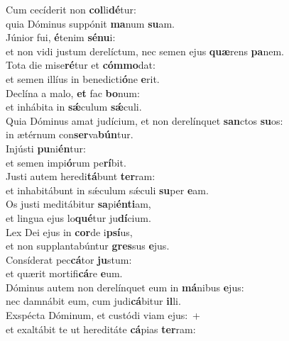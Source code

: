 \oddverse Cum cecíderit non \textbf{col}li\textbf{dé}tur:~\*\\
\oddverse quia Dóminus suppónit \textbf{ma}num \textbf{su}am.\\
\evenverse Júnior fui, \textbf{é}tenim \textbf{sé}\textbf{nu}i:~\*\\
\evenverse et non vidi justum derelíctum, nec semen ejus \textbf{quæ}rens \textbf{pa}nem.\\
\oddverse Tota die mise\textbf{ré}tur et \textbf{cóm}\textbf{mo}dat:~\*\\
\oddverse et semen illíus in benedicti\textbf{ó}ne \textbf{e}rit.\\
\evenverse Declína a malo, \textbf{et} fac \textbf{bo}num:~\*\\
\evenverse et inhábita in \textbf{sǽ}culum \textbf{sǽ}culi.\\
\oddverse Quia Dóminus amat judícium, et non derelínquet \textbf{san}ctos \textbf{su}os:~\*\\
\oddverse in ætérnum con\textbf{ser}va\textbf{bún}tur.\\
\evenverse Injústi \textbf{pu}ni\textbf{én}tur:~\*\\
\evenverse et semen impi\textbf{ó}rum pe\textbf{rí}bit.\\
\oddverse Justi autem heredi\textbf{tá}bunt \textbf{ter}ram:~\*\\
\oddverse et inhabitábunt in sǽculum sǽculi \textbf{su}per \textbf{e}am.\\
\evenverse Os justi meditábitur \textbf{sa}pi\textbf{én}\textbf{ti}am,~\*\\
\evenverse et lingua ejus lo\textbf{qué}tur ju\textbf{dí}cium.\\
\oddverse Lex Dei ejus in \textbf{cor}de i\textbf{psí}us,~\*\\
\oddverse et non supplantabúntur \textbf{gres}sus \textbf{e}jus.\\
\evenverse Consíderat pec\textbf{cá}tor \textbf{ju}stum:~\*\\
\evenverse et quærit mortifi\textbf{cá}re \textbf{e}um.\\
\oddverse Dóminus autem non derelínquet eum in \textbf{má}nibus \textbf{e}jus:~\*\\
\oddverse nec damnábit eum, cum judi\textbf{cá}bitur \textbf{il}li.\\
\evenverse Exspécta Dóminum, et custódi viam ejus:~+\\
\evenverse  et exaltábit te ut hereditáte \textbf{cá}pias \textbf{ter}ram:~\*\\
